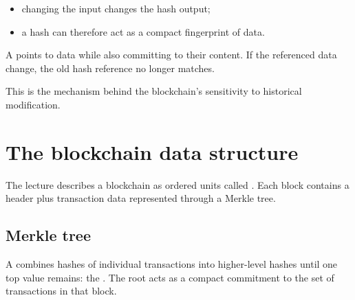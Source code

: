 \begin{itemize}
  \item changing the input changes the hash output;
  \item a hash can therefore act as a compact fingerprint of data.
\end{itemize}

A  points to data while also committing to their content. If the referenced data change, the old hash reference no longer matches.

This is the mechanism behind the blockchain's sensitivity to historical modification.

\section{The blockchain data structure}

The lecture describes a blockchain as ordered units called . Each block contains a header plus transaction data represented through a Merkle tree.

\subsection{Merkle tree}

A  combines hashes of individual transactions into higher-level hashes until one top value remains: the . The root acts as a compact commitment to the set of transactions in that block.

\begin{mlfigure}
\end{mlfigure}

